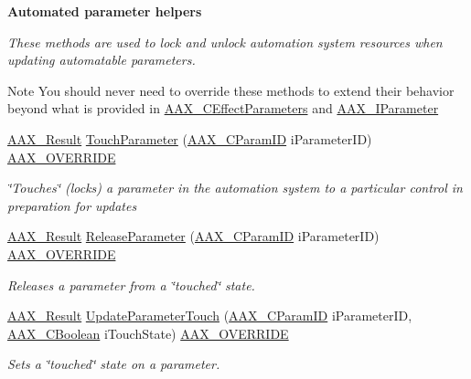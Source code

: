 \begin{Indent}\textbf{ Automated parameter helpers}\par
{\em These methods are used to lock and unlock automation system \textquotesingle{}resources\textquotesingle{} when updating automatable parameters.

\begin{DoxyNote}{Note}
You should never need to override these methods to extend their behavior beyond what is provided in \mbox{\hyperlink{a01481}{A\+A\+X\+\_\+\+C\+Effect\+Parameters}} and \mbox{\hyperlink{a01857}{A\+A\+X\+\_\+\+I\+Parameter}} 
\end{DoxyNote}
}\begin{DoxyCompactItemize}
\item 
\mbox{\hyperlink{a00392_a4d8f69a697df7f70c3a8e9b8ee130d2f}{A\+A\+X\+\_\+\+Result}} \mbox{\hyperlink{a01481_a0c7e32833e98facec61b73ac25049b13}{Touch\+Parameter}} (\mbox{\hyperlink{a00392_a1440c756fe5cb158b78193b2fc1780d1}{A\+A\+X\+\_\+\+C\+Param\+ID}} i\+Parameter\+ID) \mbox{\hyperlink{a00392_ac2f24a5172689ae684344abdcce55463}{A\+A\+X\+\_\+\+O\+V\+E\+R\+R\+I\+DE}}
\begin{DoxyCompactList}\small\item\em \char`\"{}\+Touches\char`\"{} (locks) a parameter in the automation system to a particular control in preparation for updates \end{DoxyCompactList}\item 
\mbox{\hyperlink{a00392_a4d8f69a697df7f70c3a8e9b8ee130d2f}{A\+A\+X\+\_\+\+Result}} \mbox{\hyperlink{a01481_a39c2085d444916000acec5da3797ca37}{Release\+Parameter}} (\mbox{\hyperlink{a00392_a1440c756fe5cb158b78193b2fc1780d1}{A\+A\+X\+\_\+\+C\+Param\+ID}} i\+Parameter\+ID) \mbox{\hyperlink{a00392_ac2f24a5172689ae684344abdcce55463}{A\+A\+X\+\_\+\+O\+V\+E\+R\+R\+I\+DE}}
\begin{DoxyCompactList}\small\item\em Releases a parameter from a \char`\"{}touched\char`\"{} state. \end{DoxyCompactList}\item 
\mbox{\hyperlink{a00392_a4d8f69a697df7f70c3a8e9b8ee130d2f}{A\+A\+X\+\_\+\+Result}} \mbox{\hyperlink{a01481_a035778f6cccf8cf96a11b3a028efed6e}{Update\+Parameter\+Touch}} (\mbox{\hyperlink{a00392_a1440c756fe5cb158b78193b2fc1780d1}{A\+A\+X\+\_\+\+C\+Param\+ID}} i\+Parameter\+ID, \mbox{\hyperlink{a00392_aa216506530f1d19a2965931ced2b274b}{A\+A\+X\+\_\+\+C\+Boolean}} i\+Touch\+State) \mbox{\hyperlink{a00392_ac2f24a5172689ae684344abdcce55463}{A\+A\+X\+\_\+\+O\+V\+E\+R\+R\+I\+DE}}
\begin{DoxyCompactList}\small\item\em Sets a \char`\"{}touched\char`\"{} state on a parameter. \end{DoxyCompactList}\end{DoxyCompactItemize}
\end{Indent}
